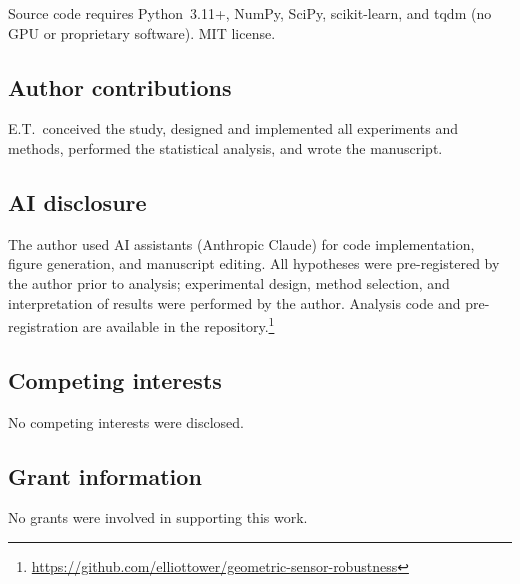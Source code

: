 \documentclass[11pt]{article}
\begin{document}
Source code requires Python~3.11+, NumPy, SciPy, scikit-learn, and
tqdm (no GPU or proprietary software).  MIT license.

\subsection*{Author contributions}

E.T.\ conceived the study, designed and implemented all experiments and
methods, performed the statistical analysis, and wrote the manuscript.

\subsection*{AI disclosure}

The author used AI assistants (Anthropic Claude) for code implementation,
figure generation, and manuscript editing.  All hypotheses were
pre-registered by the author prior to analysis; experimental design,
method selection, and interpretation of results were performed by the
author.  Analysis code and pre-registration are available in the
repository.\footnote{\url{https://github.com/elliottower/geometric-sensor-robustness}}

\subsection*{Competing interests}

No competing interests were disclosed.

\subsection*{Grant information}

No grants were involved in supporting this work.



\end{document}
